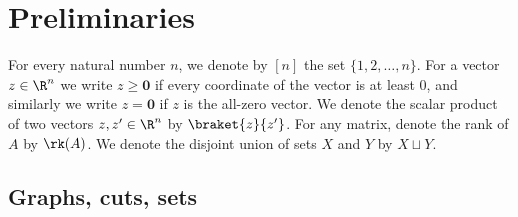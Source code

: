 































































\setcounter{theorem}{3}\section{Preliminaries}\label{sec:prelim}

For every natural number $n$, we denote by $[n]$ the set
$\{1,2, \ldots, n\}$.
For a vector $z \in \R^n$ we write $z \geq \mathbf{0}$ if every coordinate of the vector
is at least 0, and similarly we write $z = \mathbf{0}$ if $z$ is the all-zero vector.
We denote the scalar product of two vectors $z,z' \in \R^n$
by $\braket{{z}}{z'}$. For any matrix, denote the rank of $A$ by $\rk(A)$.
We denote the disjoint union of sets $X$ and $Y$ by $X \sqcup Y.$

\subsection{Graphs, cuts, sets}

